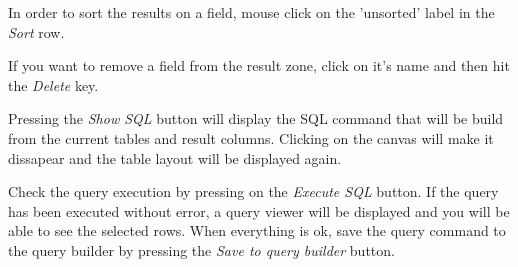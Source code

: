 In order to sort the results on a field, mouse click on the 'unsorted' label in
the \emph{Sort} row.

If you want to remove a field from the result zone, click on it's name and
then hit the \emph{Delete} key.

Pressing the \emph{Show SQL} button will display the SQL command that will be
build from the current tables and result columns. Clicking on the canvas will
make it dissapear and the table layout will be displayed again.

Check the query execution by pressing on the \emph{Execute SQL} button. If the
query has been executed without error, a query viewer will be displayed and
you will be able to see the selected rows. When everything is ok, save the
query command to the query builder by pressing the \emph{Save to query builder} button.
